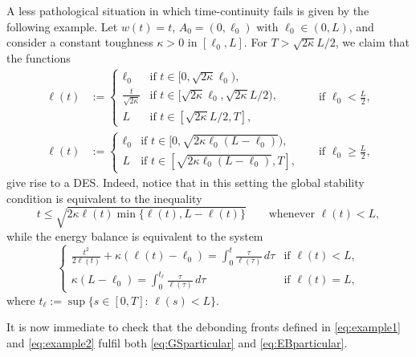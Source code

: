 \documentclass[a4paper,11pt,reqno]{amsart}
\numberwithin{equation}{section}
\theoremstyle{definition}
\theoremstyle{remark}
\begin{document}
    A less pathological situation in which time-continuity fails is given by the following example. Let $w(t)=t$, $A_0=(0,\ell_0)$ with $\ell_0\in (0,L)$, and consider a constant toughness $\kappa>0$ in $[\ell_0,L]$. For $T>\sqrt{2\kappa}L/2$, we claim that the functions
    \begin{subequations}
    \begin{align}\label{eq:example1}
        \ell(t)&:=\begin{cases}
            \ell_0 &\text{if }t\in [0,\sqrt{2\kappa}\ell_0),\\
            \frac{t}{\sqrt{2\kappa}} &\text{if }t\in [\sqrt{2\kappa}\ell_0,\sqrt{2\kappa}L/2),\\
            L &\text{if }t\in [\sqrt{2\kappa}L/2,T],
        \end{cases}&& \text{if }\ell_0<\frac L2,\\\label{eq:example2}
        \ell(t)&:=\begin{cases}
            \ell_0 &\text{if }t\in [0,\sqrt{2\kappa\ell_0(L-\ell_0)}),\\
            L &\text{if }t\in [\sqrt{2\kappa\ell_0(L-\ell_0)},T],
        \end{cases}&& \text{if }\ell_0\ge\frac L2,
    \end{align}
    \end{subequations}
    give rise to a DES. Indeed, notice that in this setting the global stability condition is equivalent to the inequality
    \begin{equation}\label{eq:GSparticular}
        t\le \sqrt{2\kappa \ell(t)\min\{\ell(t),L-\ell(t)\}}\qquad\text{whenever }\ell(t)<L,
    \end{equation}
    while the energy balance is equivalent to the system
    \begin{equation}\label{eq:EBparticular}
        \begin{cases}\displaystyle
            \frac{t^2}{2\ell(t)}+\kappa(\ell(t)-\ell_0)=\int_0^t \frac{\tau}{\ell(\tau)}\, d\tau &\text{if }\ell(t)<L,\\\displaystyle
            \kappa(L-\ell_0)=\int_0^{t_\ell}\frac{\tau}{\ell(\tau)}\, d\tau &\text{if }\ell(t)=L,
        \end{cases}
    \end{equation}
    where $t_\ell:=\sup\{s\in[0,T]:\, \ell(s)<L\}$.

    It is now immediate to check that the debonding fronts defined in \eqref{eq:example1} and \eqref{eq:example2} fulfil both \eqref{eq:GSparticular} and \eqref{eq:EBparticular}.
    
\end{document}
